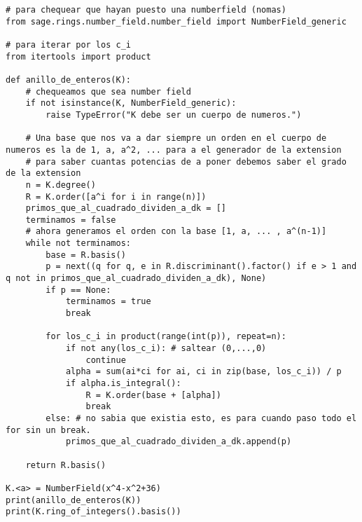 \documentclass[12pt]{amsart}
\theoremstyle{plain}
\begin{document}
\begin{lstlisting}
# para chequear que hayan puesto una numberfield (nomas)
from sage.rings.number_field.number_field import NumberField_generic

# para iterar por los c_i
from itertools import product

def anillo_de_enteros(K):
    # chequeamos que sea number field
    if not isinstance(K, NumberField_generic):
        raise TypeError("K debe ser un cuerpo de numeros.")

    # Una base que nos va a dar siempre un orden en el cuerpo de numeros es la de 1, a, a^2, ... para a el generador de la extension
    # para saber cuantas potencias de a poner debemos saber el grado de la extension
    n = K.degree()
    R = K.order([a^i for i in range(n)])
    primos_que_al_cuadrado_dividen_a_dk = []
    terminamos = false
    # ahora generamos el orden con la base [1, a, ... , a^(n-1)]
    while not terminamos:
        base = R.basis()
        p = next((q for q, e in R.discriminant().factor() if e > 1 and q not in primos_que_al_cuadrado_dividen_a_dk), None)
        if p == None:
            terminamos = true
            break

        for los_c_i in product(range(int(p)), repeat=n):
            if not any(los_c_i): # saltear (0,...,0)
                continue
            alpha = sum(ai*ci for ai, ci in zip(base, los_c_i)) / p
            if alpha.is_integral():
                R = K.order(base + [alpha])
                break
        else: # no sabia que existia esto, es para cuando paso todo el for sin un break.
            primos_que_al_cuadrado_dividen_a_dk.append(p)

    return R.basis()

K.<a> = NumberField(x^4-x^2+36)
print(anillo_de_enteros(K))
print(K.ring_of_integers().basis())

\end{lstlisting}
\end{document}
